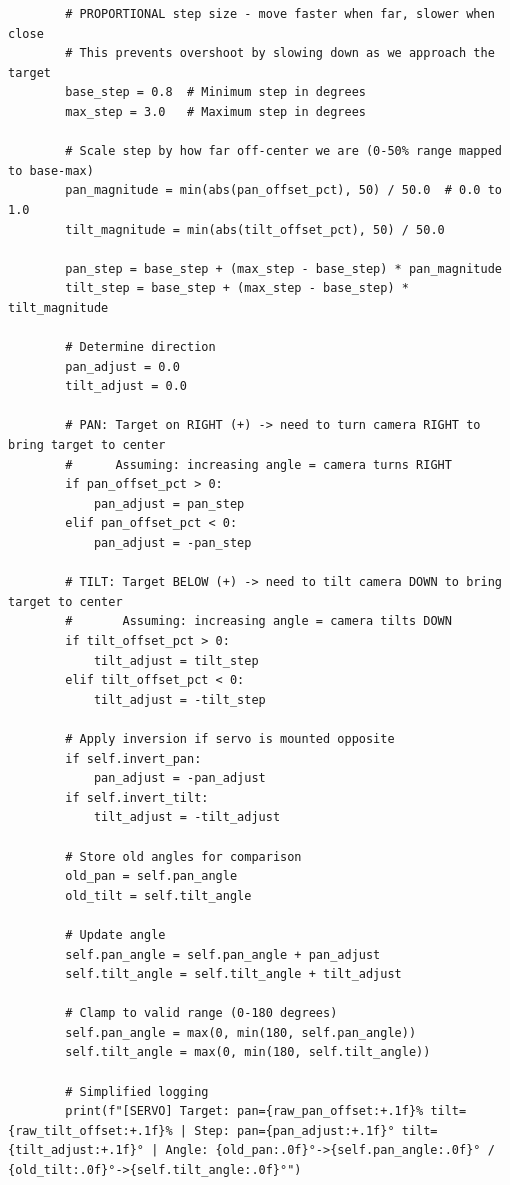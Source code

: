 \documentclass[11pt,a4paper]{article}
\begin{document}
\begin{lstlisting}
        # PROPORTIONAL step size - move faster when far, slower when close
        # This prevents overshoot by slowing down as we approach the target
        base_step = 0.8  # Minimum step in degrees
        max_step = 3.0   # Maximum step in degrees
        
        # Scale step by how far off-center we are (0-50% range mapped to base-max)
        pan_magnitude = min(abs(pan_offset_pct), 50) / 50.0  # 0.0 to 1.0
        tilt_magnitude = min(abs(tilt_offset_pct), 50) / 50.0
        
        pan_step = base_step + (max_step - base_step) * pan_magnitude
        tilt_step = base_step + (max_step - base_step) * tilt_magnitude
        
        # Determine direction
        pan_adjust = 0.0
        tilt_adjust = 0.0
        
        # PAN: Target on RIGHT (+) -> need to turn camera RIGHT to bring target to center
        #      Assuming: increasing angle = camera turns RIGHT
        if pan_offset_pct > 0:
            pan_adjust = pan_step
        elif pan_offset_pct < 0:
            pan_adjust = -pan_step
        
        # TILT: Target BELOW (+) -> need to tilt camera DOWN to bring target to center
        #       Assuming: increasing angle = camera tilts DOWN
        if tilt_offset_pct > 0:
            tilt_adjust = tilt_step
        elif tilt_offset_pct < 0:
            tilt_adjust = -tilt_step
        
        # Apply inversion if servo is mounted opposite
        if self.invert_pan:
            pan_adjust = -pan_adjust
        if self.invert_tilt:
            tilt_adjust = -tilt_adjust
        
        # Store old angles for comparison
        old_pan = self.pan_angle
        old_tilt = self.tilt_angle
        
        # Update angle
        self.pan_angle = self.pan_angle + pan_adjust
        self.tilt_angle = self.tilt_angle + tilt_adjust
        
        # Clamp to valid range (0-180 degrees)
        self.pan_angle = max(0, min(180, self.pan_angle))
        self.tilt_angle = max(0, min(180, self.tilt_angle))
        
        # Simplified logging
        print(f"[SERVO] Target: pan={raw_pan_offset:+.1f}% tilt={raw_tilt_offset:+.1f}% | Step: pan={pan_adjust:+.1f}° tilt={tilt_adjust:+.1f}° | Angle: {old_pan:.0f}°->{self.pan_angle:.0f}° / {old_tilt:.0f}°->{self.tilt_angle:.0f}°")
        

\end{lstlisting}
\end{document}
